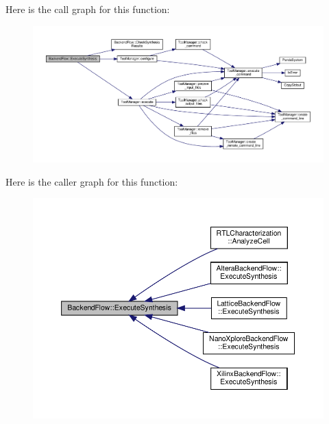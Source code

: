 Here is the call graph for this function\+:
\nopagebreak
\begin{figure}[H]
\begin{center}
\leavevmode
\includegraphics[width=350pt]{da/d75/classBackendFlow_af0e8f1973185540298eaa3ac4bee3b2c_cgraph}
\end{center}
\end{figure}
Here is the caller graph for this function\+:
\nopagebreak
\begin{figure}[H]
\begin{center}
\leavevmode
\includegraphics[width=350pt]{da/d75/classBackendFlow_af0e8f1973185540298eaa3ac4bee3b2c_icgraph}
\end{center}
\end{figure}
\mbox{\label{classBackendFlow_a384ea03eb37c09770d9d72c013793f54}} 
